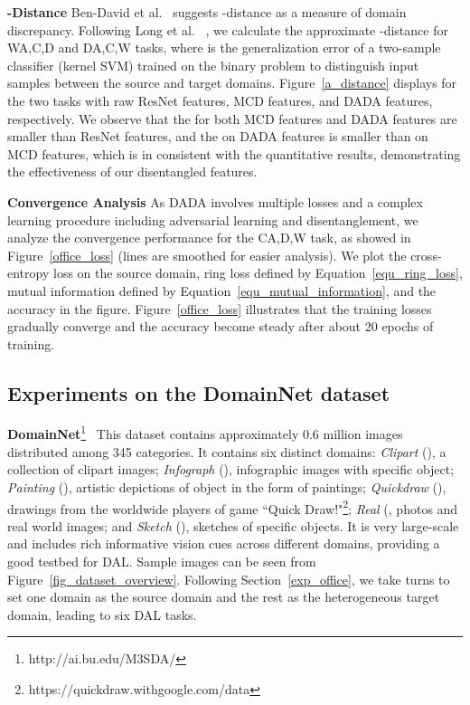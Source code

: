 \documentclass{article}
\newcommand{\BV}[1]{\color{black!10!blue}{\em #1}}
\begin{document}
\textbf{-Distance} Ben-David et al.~ suggests -distance as a measure of domain discrepancy. Following Long et al. ~, we calculate the approximate -distance  for WA,C,D and DA,C,W tasks, where  is the generalization error of a two-sample classifier (kernel SVM) trained on the binary problem to distinguish input samples between the source and target domains. Figure~\ref{a_distance} displays  for the two tasks with raw ResNet features, MCD features, and DADA features, respectively. We observe that the  for both MCD features and DADA features are smaller than ResNet features, and the  on DADA features is smaller than  on MCD features, which is in consistent with the quantitative results, demonstrating the effectiveness of our disentangled features. 

\textbf{Convergence Analysis} As DADA involves multiple losses and a complex learning procedure including adversarial learning and disentanglement, we analyze the convergence performance for the CA,D,W task, as showed in Figure~\ref{office_loss} (lines are smoothed for easier analysis). We plot the cross-entropy loss on the source domain, ring loss defined by Equation~\ref{equ_ring_loss}, mutual information defined by Equation~\ref{equ_mutual_information}, and the accuracy in the figure. Figure~\ref{office_loss} illustrates that the training losses gradually converge and the accuracy become steady after about 20 epochs of training.


\subsection{Experiments on the DomainNet dataset}
\textbf{DomainNet}\footnote{http://ai.bu.edu/M3SDA/}~\cite{domainnet} This dataset contains approximately 0.6 million images distributed among 345 categories. It contains six distinct domains: \textit{Clipart} ({\BV{clp}}), a collection of clipart images; \textit{Infograph} ({\BV{inf}}), infographic images with specific object; \textit{Painting} ({\BV{pnt}}), artistic depictions of object in the form of paintings; \textit{Quickdraw} ({\BV{qdr}}), drawings from the worldwide players of game ``Quick Draw!"\footnote{https://quickdraw.withgoogle.com/data}; \textit{Real} ({\BV{rel}}, photos and real world images; and \textit{Sketch} ({\BV{skt}}), sketches of specific objects. It is very large-scale and includes rich informative vision cues across different domains, providing a good testbed for DAL. Sample images can be seen from Figure~\ref{fig_dataset_overview}. Following Section~\ref{exp_office}, we take turns to set one domain as the source domain and the rest as the heterogeneous target domain, leading to six DAL tasks. 
\end{document}
